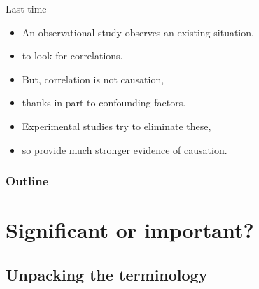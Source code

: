 

\subtitle{and checking conditions}

\date{20 October 2015}




\begin{frame}
  \maketitle
\end{frame}


\begin{frame}{Last time}

  \begin{itemize}
    \item An \alert{observational study} observes an existing situation,
    \item to look for correlations.
    \item But, \alert{correlation is not causation},
    \item thanks in part to \alert{confounding factors}.
    \item \alert{Experimental studies} try to eliminate these,
    \item so provide much stronger evidence of causation.
  \end{itemize}


\end{frame}

\begin{frame}\frametitle<presentation>{Outline}
  \tableofcontents
\end{frame}

\section{Significant or important?}

\subsection{Unpacking the terminology}


